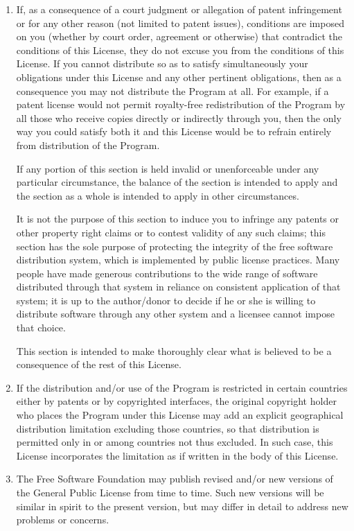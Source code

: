 \documentclass[se]{uw-wkrpt}
\begin{document}
\begin{singlespacing}
\begin{enumerate}
\item If, as a consequence of a court judgment or allegation of patent
infringement or for any other reason (not limited to patent issues),
conditions are imposed on you (whether by court order, agreement or
otherwise) that contradict the conditions of this License, they do not
excuse you from the conditions of this License.  If you cannot
distribute so as to satisfy simultaneously your obligations under this
License and any other pertinent obligations, then as a consequence you
may not distribute the Program at all.  For example, if a patent
license would not permit royalty-free redistribution of the Program by
all those who receive copies directly or indirectly through you, then
the only way you could satisfy both it and this License would be to
refrain entirely from distribution of the Program.

If any portion of this section is held invalid or unenforceable under
any particular circumstance, the balance of the section is intended to
apply and the section as a whole is intended to apply in other
circumstances.

It is not the purpose of this section to induce you to infringe any
patents or other property right claims or to contest validity of any
such claims; this section has the sole purpose of protecting the
integrity of the free software distribution system, which is
implemented by public license practices.  Many people have made
generous contributions to the wide range of software distributed
through that system in reliance on consistent application of that
system; it is up to the author/donor to decide if he or she is willing
to distribute software through any other system and a licensee cannot
impose that choice.

This section is intended to make thoroughly clear what is believed to
be a consequence of the rest of this License.

\item If the distribution and/or use of the Program is restricted in
certain countries either by patents or by copyrighted interfaces, the
original copyright holder who places the Program under this License
may add an explicit geographical distribution limitation excluding
those countries, so that distribution is permitted only in or among
countries not thus excluded.  In such case, this License incorporates
the limitation as if written in the body of this License.

\item The Free Software Foundation may publish revised and/or new versions
of the General Public License from time to time.  Such new versions will
be similar in spirit to the present version, but may differ in detail to
address new problems or concerns.


\end{enumerate}
\end{singlespacing}
\end{document}
